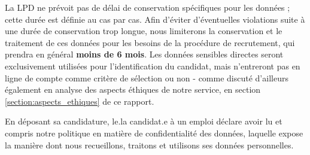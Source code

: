  La LPD ne prévoit pas de délai de conservation spécifiques pour les données ; cette durée est définie au cas par cas. Afin d'éviter d'éventuelles violations suite à une durée de conservation trop longue, nous limiterons la conservation et le traitement de ces données  pour les besoins de la procédure de recrutement, qui prendra en général \textbf{moins de 6 mois}. Les données sensibles directes seront exclusivement utilisées pour l'identification du candidat, mais n'entreront pas en ligne de compte comme critère de sélection ou non - comme discuté d'ailleurs également en analyse des aspects éthiques de notre service, en section \ref{section:aspects_ethiques} de ce rapport.\newline
 
En déposant sa candidature, le.la candidat.e à un emploi déclare avoir lu et compris notre politique en matière de confidentialité des données, laquelle expose la manière dont nous recueillons, traitons et utilisons ses données personnelles.